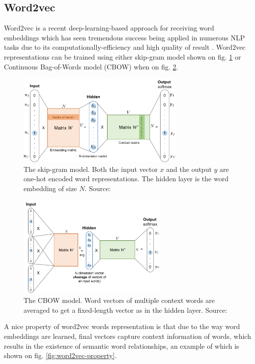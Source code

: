 \subsection{Word2vec} 
Word2vec is a recent deep-learning-based approach for receiving word embeddings which has seen tremendous success being applied in numerous NLP tasks due to its computationally-efficiency and high quality of result \cite{Mikolov-NIPS2013}. Word2vec representations can be trained using either skip-gram model \citep{Mikolov-NIPS2013} shown on fig. \ref{fig:word2vec-skip-gram}  or Continuous Bag-of-Words model (CBOW) \citep{Mikolov-ICLR2013} when on fig. \ref{fig:word2vec-cbow}.

\begin{figure}[h]
    \centering
    \includegraphics[height=4.5cm]{Images/word2vec-skip-gram.png}
    \caption{The skip-gram model. Both the input vector $x$ and the output $y$ are one-hot encoded word representations. The hidden layer is the word embedding of size $N$. Source: \citep{Weng-2017}}
    \label{fig:word2vec-skip-gram}
\end{figure} 

\begin{figure}[h]
    \centering
    \includegraphics[height=5cm]{Images/word2vec-cbow.png}
    \caption{The CBOW model. Word vectors of multiple context words are averaged to get a fixed-length vector as in the hidden layer. Source: \citep{Weng-2017}}
    \label{fig:word2vec-cbow}
\end{figure} 

A nice property of word2vec words representation is that due to the way word embeddings are learned, final vectors capture context information of words, which results in the existence of semantic word relationships, an example of which is shown on fig. \ref{fig:word2vec-property}. 

